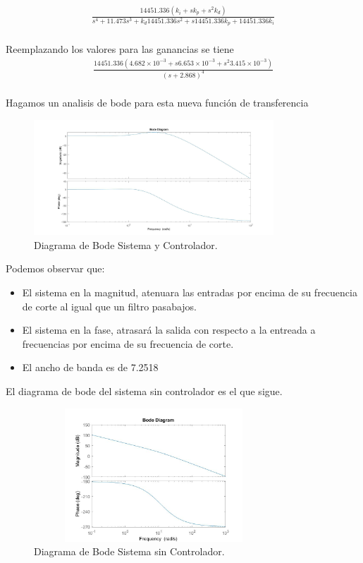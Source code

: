 \documentclass[a4paper]{IEEEtran} %
\begin{document}
\begin{equation}
    \begin{split}
        \frac{14451.336(k_{i}+sk_{p}+s^2k_{d})}{s^4+11.473s^3+k_{d}14451.336s^2+s14451.336k_{p}+14451.336k_{i}}\\
    \end{split}
    \label{eq:PD_num}
\end{equation}

Reemplazando los valores para las ganancias se tiene
\begin{equation}
    \begin{split}
        \frac{14451.336(4.682\times 10^{-3}+s6.653\times 10^{-3}+s^2 3.415\times 10^{-3})}{(s+2.868)^4}\\
    \end{split}
    \label{eq:PD_num_reeempla}
\end{equation}

Hagamos un analisis de bode para esta nueva función de transferencia
\vspace{60mm}
\begin{figure}[h]
    \centering
        \includegraphics[width=9cm]{images/14}
        \caption{Diagrama de Bode Sistema y Controlador.}
        \label{fig:bode}
\end{figure}

Podemos observar que:

\begin{itemize}
    \item El sistema en la magnitud, atenuara las entradas por encima de su frecuencia de corte al igual que un filtro pasabajos.
    \item El sistema en la fase, atrasará la salida con respecto a la entreada a frecuencias por encima de su frecuencia de corte.
    \item El ancho de banda es de 7.2518  
\end{itemize}

El diagrama de bode del sistema sin controlador es el que sigue.

\begin{figure}[h]
    \centering
        \includegraphics[width=9cm,height=5cm]{images/15}
        \caption{Diagrama de Bode Sistema sin Controlador.}
\end{figure}
\end{document}
